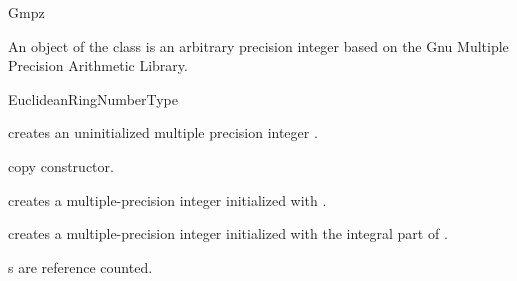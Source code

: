 \begin{ccRefClass} {Gmpz}
\label{Gmpz}

\ccDefinition

An object of the class  is an arbitrary precision integer 
based on the {\sc Gnu} Multiple Precision Arithmetic Library. 


\ccIsModel
EuclideanRingNumberType

\ccCreation
{}

             {creates an uninitialized multiple precision integer \ccVar.}

\ccHidden {}
            {copy constructor.}

            {creates a multiple-precision integer initialized with
             .}

            {creates a multiple-precision integer initialized with
             the integral part of .}


\ccImplementation
{}s are reference counted.

\end{ccRefClass} 
